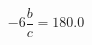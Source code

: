 \documentclass[preview]{standalone}
\begin{document}
\begin{align*}
-6 \dfrac{b}{c}= 180.0
\end{align*}
\end{document}
